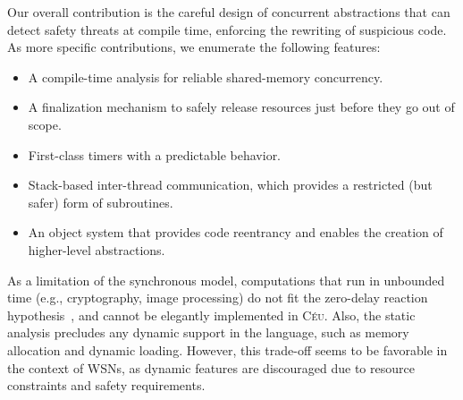 \documentclass[10pt]{sensys-proc}
\newcommand{\CEU}{\textsc{C\'{e}u}\xspace}
\begin{document}
Our overall contribution is the careful design of concurrent abstractions that 
can detect safety threats at compile time, enforcing the rewriting of 
suspicious code.
As more specific contributions, we enumerate the following features:

\begin{itemize}
\item A compile-time analysis for reliable shared-memory concurrency.
\item A finalization mechanism to safely release resources just before they go 
      out of scope.
\item First-class timers with a predictable behavior.
\item Stack-based inter-thread communication, which provides a restricted (but 
      safer) form of subroutines.
\item An object system that provides code reentrancy and enables the creation 
      of higher-level abstractions.
\end{itemize}

As a limitation of the synchronous model, computations that run in unbounded 
time (e.g., cryptography, image processing) do not fit the zero-delay reaction
hypothesis~\cite{rp.hypothesis}, and cannot be elegantly implemented in \CEU.
Also, the static analysis precludes any dynamic support in the language, such 
as memory allocation and dynamic loading.
However, this trade-off seems to be favorable in the context of WSNs, as 
dynamic features are discouraged due to resource constraints and safety 
requirements.

\begin{comment}
Our design is first compromised with the main principles that govern WSNs 
development: \emph{resource minimization} and \emph{bug prevention}, as defined 
by Levis~\cite{wsn.decade}.
That said, the support for hierarchical compositions, together with a 
convenient syntax for timers and internal communication also lead to more 
compact programs (up to 70\% reduction, in our evaluation).

TODO

SAFETY, both react to time, what if they access memory, who executes first
CEU detects at compile time and raises a warning

Node-system-imperative
    - not macro
    - not declarative
    - drivers, protocols, control-intensive apps

Synchronous
    - not preemptive, actors

ED->MT->HC

Safety and expressiveness co-design

abstractions need to be first class
\end{comment}
\end{document}
